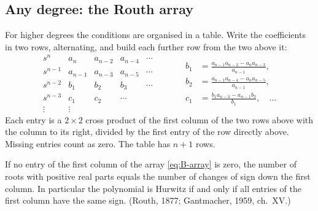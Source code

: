 \subsection{Any degree: the Routh array}
For higher degrees the conditions are organised in a table. Write the coefficients in two rows, alternating, and build each further row from the two above it:
\begin{equation}\label{eq:B-array}
\begin{array}{c|cccc}
  s^n & a_n & a_{n-2} & a_{n-4} & \cdots\\
  s^{n-1} & a_{n-1} & a_{n-3} & a_{n-5} & \cdots\\
  s^{n-2} & b_1 & b_2 & b_3 & \cdots\\
  s^{n-3} & c_1 & c_2 & \cdots & \\
  \vdots & \vdots & & &
\end{array}
\qquad\quad
\begin{aligned}
  b_1 &= \frac{a_{n-1}a_{n-2} - a_n a_{n-3}}{a_{n-1}},\\[2pt]
  b_2 &= \frac{a_{n-1}a_{n-4} - a_n a_{n-5}}{a_{n-1}},\\[2pt]
  c_1 &= \frac{b_1 a_{n-3} - a_{n-1} b_2}{b_1}, \quad\dots
\end{aligned}
\end{equation}
Each entry is a $2 \times 2$ cross product of the first column of the two rows above with the column to its right, divided by the first entry of the row directly above. Missing entries count as zero. The table has $n + 1$ rows.

\begin{theorem}[Routh]
\label{thm:B-routh}
If no entry of the first column of the array \eqref{eq:B-array} is zero, the number of roots with positive real parts equals the number of changes of sign down the first column. In particular the polynomial is Hurwitz if and only if all entries of the first column have the same sign. (Routh, 1877; Gantmacher, 1959, ch.~XV.)
\end{theorem}

